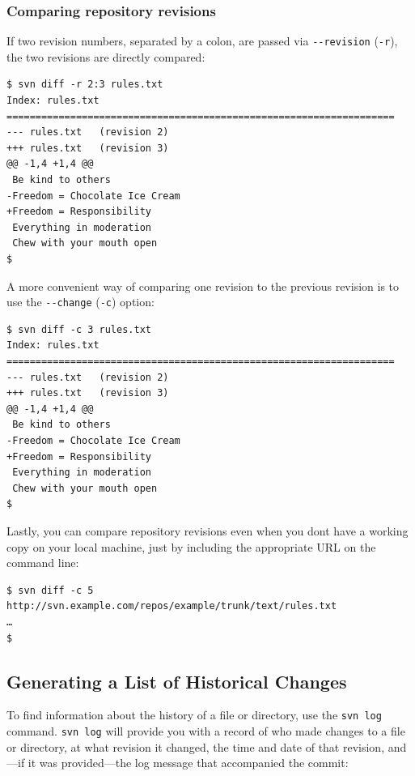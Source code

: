 \subsubsection{Comparing repository
revisions}\label{svn.tour.history.diff.reposrepos}

If two revision numbers, separated by a colon, are passed via
\texttt{-\/-revision} (\texttt{-r}), the two revisions are directly
compared:

\begin{verbatim}
$ svn diff -r 2:3 rules.txt
Index: rules.txt
===================================================================
--- rules.txt   (revision 2)
+++ rules.txt   (revision 3)
@@ -1,4 +1,4 @@
 Be kind to others
-Freedom = Chocolate Ice Cream
+Freedom = Responsibility
 Everything in moderation
 Chew with your mouth open
$
\end{verbatim}

A more convenient way of comparing one revision to the previous revision
is to use the \texttt{-\/-change} (\texttt{-c}) option:

\begin{verbatim}
$ svn diff -c 3 rules.txt
Index: rules.txt
===================================================================
--- rules.txt   (revision 2)
+++ rules.txt   (revision 3)
@@ -1,4 +1,4 @@
 Be kind to others
-Freedom = Chocolate Ice Cream
+Freedom = Responsibility
 Everything in moderation
 Chew with your mouth open
$
\end{verbatim}

Lastly, you can compare repository revisions even when you
don\textquotesingle t have a working copy on your local machine, just by
including the appropriate URL on the command line:

\begin{verbatim}
$ svn diff -c 5 http://svn.example.com/repos/example/trunk/text/rules.txt
…
$
\end{verbatim}

\subsection{Generating a List of Historical
Changes}\label{svn.tour.history.log}

To find information about the history of a file or directory, use the
\texttt{svn\ log} command. \texttt{svn\ log} will provide you with a
record of who made changes to a file or directory, at what revision it
changed, the time and date of that revision, and---if it was
provided---the log message that accompanied the commit:

